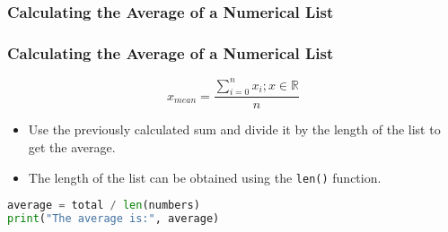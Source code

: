 \documentclass{beamer}
\begin{document}
    \subsubsection{Calculating the Average of a Numerical List}
    \begin{frame}[fragile]
        \frametitle{Calculating the Average of a Numerical List}
        \begin{equation*}
            x_{mean}= \frac{\sum_{i=0}^{n} x_{i}; x \in \mathbb{R}}{n}
        \end{equation*}
        \begin{itemize}
            \item Use the previously calculated sum and divide it by the length of the list to get the average.
            \item The length of the list can be obtained using the \texttt{len()} function.
        \end{itemize}
        \begin{lstlisting}[language=Python]
average = total / len(numbers)
print("The average is:", average)
        \end{lstlisting}
    \end{frame}
\end{document}
